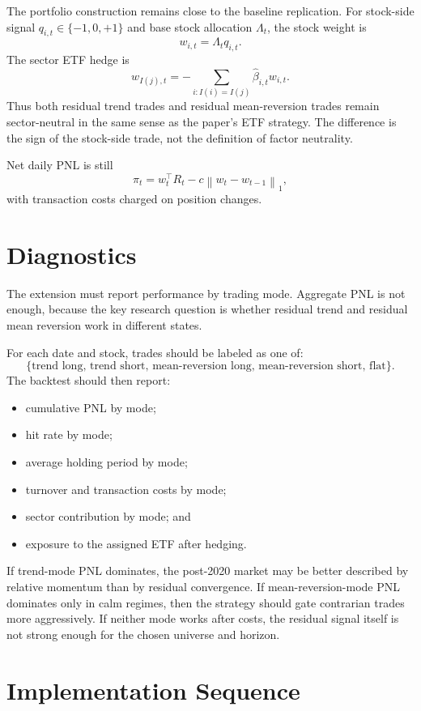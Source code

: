 \documentclass[11pt]{article}
\begin{document}
The portfolio construction remains close to the baseline replication. For
stock-side signal $q_{i,t}\in\{-1,0,+1\}$ and base stock allocation
$\Lambda_t$, the stock weight is
\[
    w_{i,t} = \Lambda_t q_{i,t}.
\]
The sector ETF hedge is
\[
    w_{I(j),t}
    =
    -\sum_{i:I(i)=I(j)}
    \widehat{\beta}_{i,t} w_{i,t}.
\]
Thus both residual trend trades and residual mean-reversion trades remain
sector-neutral in the same sense as the paper's ETF strategy. The difference
is the sign of the stock-side trade, not the definition of factor neutrality.

Net daily PNL is still
\[
    \pi_t
    =
    w_t^\top R_t
    -
    c\left\|w_t-w_{t-1}\right\|_1,
\]
with transaction costs charged on position changes.

\section{Diagnostics}

The extension must report performance by trading mode. Aggregate PNL is not
enough, because the key research question is whether residual trend and
residual mean reversion work in different states.

For each date and stock, trades should be labeled as one of:
\[
    \{\text{trend long},\,
      \text{trend short},\,
      \text{mean-reversion long},\,
      \text{mean-reversion short},\,
      \text{flat}\}.
\]
The backtest should then report:
\begin{itemize}
    \item cumulative PNL by mode;
    \item hit rate by mode;
    \item average holding period by mode;
    \item turnover and transaction costs by mode;
    \item sector contribution by mode; and
    \item exposure to the assigned ETF after hedging.
\end{itemize}

If trend-mode PNL dominates, the post-2020 market may be better described by
relative momentum than by residual convergence. If mean-reversion-mode PNL
dominates only in calm regimes, then the strategy should gate contrarian
trades more aggressively. If neither mode works after costs, the residual
signal itself is not strong enough for the chosen universe and horizon.

\section{Implementation Sequence}
\end{document}
